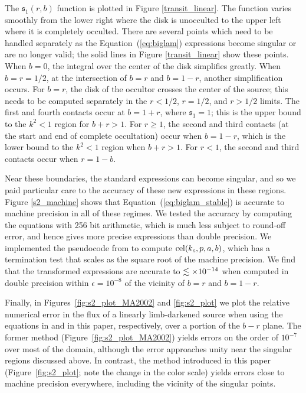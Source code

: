 \documentclass[modern]{aastex61}
\begin{document}
The $\mathfrak{s}_1(r,b)$ function is plotted in Figure \ref{transit_linear}. The
function varies smoothly from the lower right where the disk is
unocculted to the upper left where it is completely occulted.
There are several points which need to be handled separately as
the Equation~(\ref{eq:biglam}) expressions become singular or are
no longer valid;  the solid lines in Figure \ref{transit_linear} show
these points.  When $b=0$, the integral over the center of the
disk simplifies greatly.  When $b=r=1/2$, at the intersection of
$b=r$ and $b=1-r$, another simplification occurs.  For $b=r$,
the disk of the occultor crosses the center of the source;
this needs to be computed separately in the $r<1/2$, $r=1/2$,
and $r>1/2$ limits.  The first and fourth contacts occur at
$b=1+r$, where $\mathfrak{s}_1=1$;  this is the upper bound to the $k^2 < 1$
region for $b+r >1$.
For $r \ge 1$, the second and third contacts (at the start and
end of complete occultation) occur when $b=1-r$, which is the
lower  bound to the $k^2<1$ region when $b+r >1$.
For $r < 1$, the second and third contacts occur when $r=1-b$.

Near these boundaries, the standard \citet{MandelAgol2002} expressions
can become singular, and so we paid particular care to the accuracy of these
new expressions in these regions.  Figure \ref{s2_machine} shows
that Equation~(\ref{eq:biglam_stable}) is accurate to machine
precision in all of these regimes.
We tested the accuracy by computing the equations with 256 bit
arithmetic, which is much less subject to round-off error, and
hence gives more precise expressions than double precision.  We implemented the
pseudocode from \citet{Bulirsch1969} to compute ${\rm cel}(k_c,p,a,b)$,
which has a termination test that scales as the square root of
the machine precision.  We find that the transformed expressions
are accurate to $\lesssim \times 10^{-14}$ when computed in double precision
within $\epsilon = 10^{-8}$ of the vicinity of $b=r$ and $b=1-r$.

Finally, in Figures~\ref{fig:s2_plot_MA2002} and \ref{fig:s2_plot} we plot
the relative numerical error in the flux of a linearly limb-darkened source
when using the equations in \citet{MandelAgol2002} and in this paper,
respectively, over a portion of the $b-r$ plane. The former method
(Figure~\ref{fig:s2_plot_MA2002}) yields errors
on the order of $10^{-7}$ over most of the domain, although the error approaches
unity near the singular regions discussed above. In contrast, the method introduced
in this paper (Figure~\ref{fig:s2_plot}; note the change in the color scale)
yields errors close to machine precision everywhere, including the vicinity of the
singular points.
\end{document}
